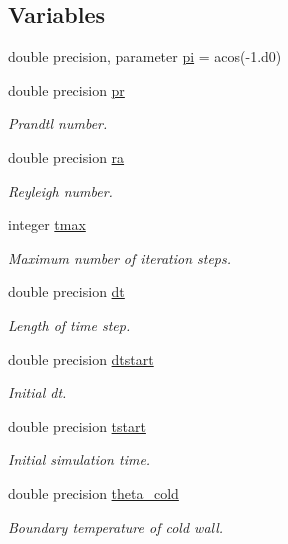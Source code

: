 \subsection*{Variables}
\begin{DoxyCompactItemize}
\item 
double precision, parameter \mbox{\hyperlink{namespaceglobal_a2eeeef6cb4401e0205ced808c718dead}{pi}} = acos(-\/1.d0)
\item 
double precision \mbox{\hyperlink{namespaceglobal_a31749f11f262d021576cd0d09bdc79c2}{pr}}
\begin{DoxyCompactList}\small\item\em Prandtl number. \end{DoxyCompactList}\item 
double precision \mbox{\hyperlink{namespaceglobal_a7b363950bb58d4e52dda12a928b2b9e2}{ra}}
\begin{DoxyCompactList}\small\item\em Reyleigh number. \end{DoxyCompactList}\item 
integer \mbox{\hyperlink{namespaceglobal_ac8816f9dd096716fb9b7e61d57cc5189}{tmax}}
\begin{DoxyCompactList}\small\item\em Maximum number of iteration steps. \end{DoxyCompactList}\item 
double precision \mbox{\hyperlink{namespaceglobal_a24d27ecfb0e7d422997122c9345bac8b}{dt}}
\begin{DoxyCompactList}\small\item\em Length of time step. \end{DoxyCompactList}\item 
double precision \mbox{\hyperlink{namespaceglobal_a3c8fbc22da61f7188e79bad2b9ba1d16}{dtstart}}
\begin{DoxyCompactList}\small\item\em Initial dt. \end{DoxyCompactList}\item 
double precision \mbox{\hyperlink{namespaceglobal_a07363365436fd22a91cdb5a847b4bb88}{tstart}}
\begin{DoxyCompactList}\small\item\em Initial simulation time. \end{DoxyCompactList}\item 
double precision \mbox{\hyperlink{namespaceglobal_a367640054e0083add94204f1a61bd61a}{theta\+\_\+cold}}
\begin{DoxyCompactList}\small\item\em Boundary temperature of cold wall. \end{DoxyCompactList}\item 

\end{DoxyCompactItemize}
